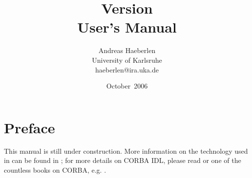 \documentclass[a4paper, 11pt]{book}
\begin{document}
\title{\IDL Version \Version{}\\User's Manual}
\author{Andreas Haeberlen\\University of Karlsruhe\\haeberlen@ira.uka.de}
\date{October~2006}
\maketitle

\chapter*{Preface}
This manual is still under construction. More information on the 
technology used in \IDL can be found in \cite{idl4}; for more details on
CORBA IDL, please read \cite{corba-iiop} or one of the countless books
on CORBA, e.g. \cite{redlich}.

\tableofcontents









\footnotesize



\end{document}
